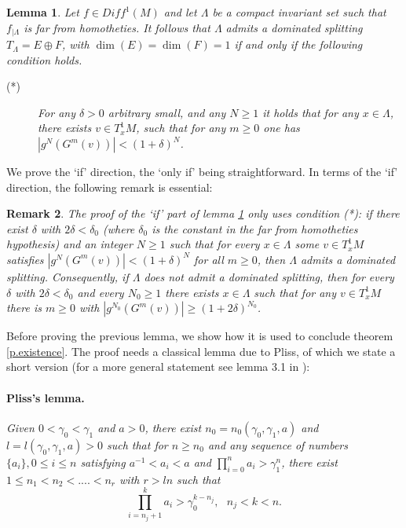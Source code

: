 \documentclass[a4paper,11pt]{article}
\newtheorem{lemma}{Lemma}
\newtheorem{remark}[lemma]{Remark}
\theoremstyle{definition}
\def\La{\Lambda}
\def\de{\delta}
\def\La{\Lambda}
\begin{document}
\begin{lemma}\label{DScond} Let $f\in Diff^1(M)$ and let $\Lambda$ be a compact invariant set such that $f_{|\La}$ is far from homotheties. It follows that
$\Lambda$ admits a dominated splitting $T_\Lambda=E\oplus F$, with $\dim(E)=\dim(F)=1$
if and only if the following condition holds.
\begin{description}
\item[(*)] For any  $\delta>0$ arbitrary small, and any  $N\geq 1$ it holds that for any $x\in \Lambda$, there exists $v\in T^1_xM$, such that
for any $m\geq 0$ one has $|g^N(G^m(v))|<(1+\delta)^N$.
\end{description}
\end{lemma}

We prove the `if' direction, the `only if' being straightforward. In terms of the `if' direction, the following remark is essential:

\begin{remark}\label{rmk:single-pair}
The proof of the `if' part of lemma \ref{DScond} only uses condition (*): if there exist $\de$ with $2\de<\de_0$
(where $\de_0$ is the constant in the far from homotheties hypothesis) and
an integer $N\geq 1$ such that for every $x\in\La$ some $v\in T^1_xM$
satisfies $|g^{N}(G^m(v))|<(1+\de)^{N}$ for all $m\geq 0$, then $\La$ admits
a dominated splitting. Consequently, if $\La$ does not admit a dominated
splitting, then for \emph{every} $\de$ with $2\de<\de_0$ and \emph{every}
$N_0\geq 1$ there exists $x\in\La$ such that for any $v\in T^1_xM$ there is
$m\geq 0$ with $|g^{N_0}(G^{m}(v))|\geq (1+2\de)^{N_0}$.
\end{remark}



Before proving the previous lemma, we show how it is used to conclude theorem \ref{p.existence}. The proof needs a classical lemma due to Pliss, of which we state a short version  (for a more general statement see lemma 3.1 in \cite{CP}):
    \vskip 3pt

\paragraph{\bf Pliss's lemma.}{\it    
Given $0 < \gamma_0 < \gamma_1$ and $a > 0$, there exist $n_0 = n_0(\gamma_0,\gamma_1,a)$ and
$l = l(\gamma_0,\gamma_1,a) > 0$ such that for $n\geq n_0$ and  any sequence of numbers $\{a_i\}, 0\leq i\leq n$  satisfying 
$a^{-1} < a_i < a$ and $\prod ^n_{i=0} a_i > \gamma_1^{n}$,  there exist $1 \leq n_1 < n_2 < ....< n_r$ with $r > ln$ such that
$$\prod ^k_{i=n_j+1}  a_i > \gamma_0^{k-n_j},\,\,\,\, n_j < k < n.$$}
    \vskip 3pt
\end{document}
